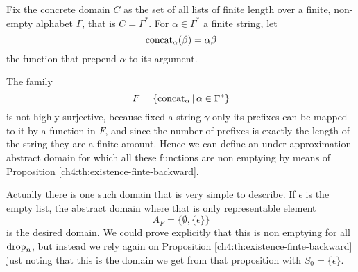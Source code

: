 \begin{example}
	Fix the concrete domain $C$ as the set of all lists of finite length over a finite, non-empty alphabet $\Gamma$, that is $C = \Gamma^{*}$.
	For $\alpha \in \Gamma^*$ a finite string, let
	\[
	\text{concat}_{\alpha}(\beta) = \alpha \beta
	\]
	the function that prepend $\alpha$ to its argument.

	The family
	\[
	F = \{ \text{concat}_{\alpha} \,\vert\, \alpha \in \Gamma^* \}
	\]
	is not highly surjective, because fixed a string $\gamma$ only its prefixes can be mapped to it by a function in $F$, and since the number of prefixes is exactly the length of the string they are a finite amount.
	Hence we can define an under-approximation abstract domain for which all these functions are non emptying by means of Proposition \ref{ch4:th:existence-finte-backward}.

	Actually there is one such domain that is very simple to describe. If $\epsilon$ is the empty list, the abstract domain where that is only representable element
	\[
	A_F = \{ \emptyset, \{ \epsilon \} \}
	\]
	is the desired domain. We could prove explicitly that this is non emptying for all $\text{drop}_n$, but instead we rely again on Proposition \ref{ch4:th:existence-finte-backward} just noting that this is the domain we get from that proposition with $S_0 = \{ \epsilon \}$.
\end{example}

